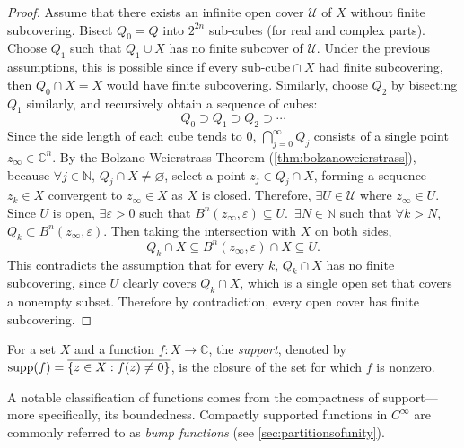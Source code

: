 \begin{proof}
    Assume that there exists an infinite open cover \(\mathcal{U}\) of \(X\) without finite subcovering. Bisect \(Q_0=Q\) into \(2^{2n}\) sub-cubes (for real and complex parts). Choose \(Q_1\) such that \(Q_1\cup X\) has no finite subcover of \(\mathcal{U}\). Under the previous assumptions, this is possible since if every \(\text{sub-cube}\cap X\) had finite subcovering, then \(Q_0\cap X=X\) would have finite subcovering. Similarly, choose \(Q_2\) by bisecting \(Q_1\) similarly, and recursively obtain a sequence of cubes:
    \[Q_0\supset Q_1\supset Q_2\supset\cdots\]
    Since the side length of each cube tends to 0, \(\bigcap_{j=0}^\infty Q_j\) consists of a single point \(z_{\infty}\in\mathbb{C}^n\). By the Bolzano-Weierstrass Theorem (\cref{thm:bolzanoweierstrass}), because \(\forall j\in\mathbb{N}\), \(Q_j\cap X\neq\varnothing\), select a point \(z_{j}\in Q_j\cap X\), forming a sequence \({z_k}\in X\) convergent to \(z_\infty\in X\) as \(X\) is closed. Therefore, \(\exists U\in\mathcal{U}\) where \(z_\infty\in U\). Since \(U\) is open, \(\exists\varepsilon>0\) such that \(B^n(z_\infty,\varepsilon)\subseteq U\).\ \(\exists N\in\mathbb{N}\) such that \(\forall k>N\), \(Q_k\subset B^n(z_\infty,\varepsilon)\). Then taking the intersection with \(X\) on both sides, \[Q_k\cap X\subseteq B^n(z_\infty,\varepsilon)\cap X\subseteq U.\]
    This contradicts the assumption that for every \(k\), \(Q_k\cap X\) has no finite subcovering, since \(U\) clearly covers \(Q_k\cap X\), which is a single open set that covers a nonempty subset. Therefore by contradiction, every open cover has finite subcovering.
\end{proof}
\begin{definition}\label{def:support}
    For a set \(X\) and a function \(f:X\to\mathbb{C}\), the \textit{support}, denoted by \(\supp(f)=\overline{\cbraces{z\in X}{f(z)\neq 0}}\), is the closure of the set for which \(f\) is nonzero.
\end{definition}
\begin{remark}
    A notable classification of functions comes from the compactness of support---more specifically, its boundedness. Compactly supported functions in \(C^\infty\) are commonly referred to as \textit{bump functions} (see \cref{sec:partitionsofunity}).
\end{remark}